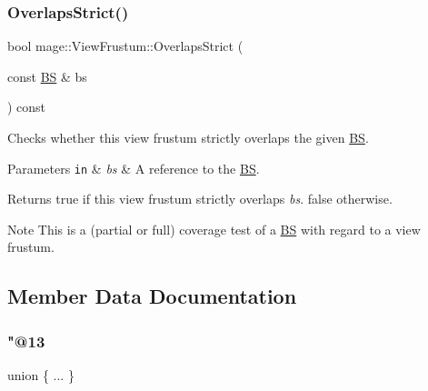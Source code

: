 \subsubsection{\texorpdfstring{Overlaps\+Strict()}{OverlapsStrict()}\hspace{0.1cm}{\footnotesize\ttfamily [2/2]}}
{\footnotesize\ttfamily bool mage\+::\+View\+Frustum\+::\+Overlaps\+Strict (\begin{DoxyParamCaption}\item[{const \hyperlink{structmage_1_1_b_s}{BS} \&}]{bs }\end{DoxyParamCaption}) const\hspace{0.3cm}{\ttfamily [noexcept]}}

Checks whether this view frustum strictly overlaps the given \hyperlink{structmage_1_1_b_s}{BS}.


\begin{DoxyParams}[1]{Parameters}
\mbox{\tt in}  & {\em bs} & A reference to the \hyperlink{structmage_1_1_b_s}{BS}. \\
\hline
\end{DoxyParams}
\begin{DoxyReturn}{Returns}
{\ttfamily true} if this view frustum strictly overlaps {\itshape bs}. {\ttfamily false} otherwise. 
\end{DoxyReturn}
\begin{DoxyNote}{Note}
This is a (partial or full) coverage test of a \hyperlink{structmage_1_1_b_s}{BS} with regard to a view frustum. 
\end{DoxyNote}


\subsection{Member Data Documentation}
\hypertarget{structmage_1_1_view_frustum_aeed161a3b8e59ff5d5392051f27b386b}{}\label{structmage_1_1_view_frustum_aeed161a3b8e59ff5d5392051f27b386b} 
\subsubsection{\texorpdfstring{"@13}{@13}}
{\footnotesize\ttfamily union \{ ... \} \hspace{0.3cm}{\ttfamily [private]}}

\hypertarget{structmage_1_1_view_frustum_a66ea2332f1c30b7a1d3ba8f0f0fed347}{}\label{structmage_1_1_view_frustum_a66ea2332f1c30b7a1d3ba8f0f0fed347} 
